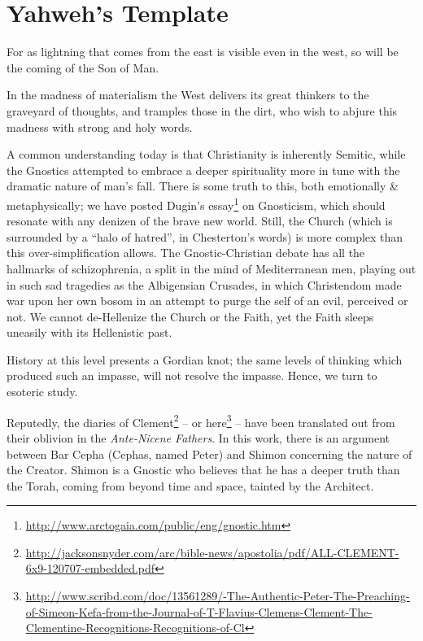 \section{Yahweh’s Template}

\begin{quotationx}
For as lightning that comes from the east is visible even in the west, so will be the coming of the Son of Man.

In the madness of materialism the West delivers its great thinkers to the graveyard of thoughts, and tramples those in the dirt, who wish to abjure this madness with strong and holy words.
\end{quotationx}


A common understanding today is that Christianity is inherently Semitic, while the Gnostics attempted to embrace a deeper spirituality more in tune with the dramatic nature of man's fall. There is some truth to this, both emotionally \& metaphysically; we have posted Dugin's essay\footnote{\url{http://www.arctogaia.com/public/eng/gnostic.htm}} on Gnosticism, which should resonate with any denizen of the brave new world. Still, the Church (which is surrounded by a ``halo of hatred'', in Chesterton's words) is more complex than this over-simplification allows. The Gnostic-Christian debate has all the hallmarks of schizophrenia, a split in the mind of Mediterranean men, playing out in such sad tragedies as the Albigensian Crusades, in which Christendom made war upon her own bosom in an attempt to purge the self of an evil, perceived or not. We cannot de-Hellenize the Church or the Faith, yet the Faith sleeps uneasily with its Hellenistic past.

History at this level presents a Gordian knot; the same levels of thinking which produced such an impasse, will not resolve the impasse. Hence, we turn to esoteric study.

Reputedly, the diaries of Clement\footnote{\url{http://jacksonsnyder.com/arc/bible-news/apostolia/pdf/ALL-CLEMENT-6x9-120707-embedded.pdf}} -- or here\footnote{\url{http://www.scribd.com/doc/13561289/-The-Authentic-Peter-The-Preaching-of-Simeon-Kefa-from-the-Journal-of-T-Flavius-Clemens-Clement-The-Clementine-Recognitions-Recognitions-of-Cl}} -- have been translated out from their oblivion in the \emph{Ante-Nicene Fathers}. In this work, there is an argument between Bar Cepha (Cephas, named Peter) and Shimon concerning the nature of the Creator. Shimon is a Gnostic who believes that he has a deeper truth than the Torah, coming from beyond time and space, tainted by the Architect.

